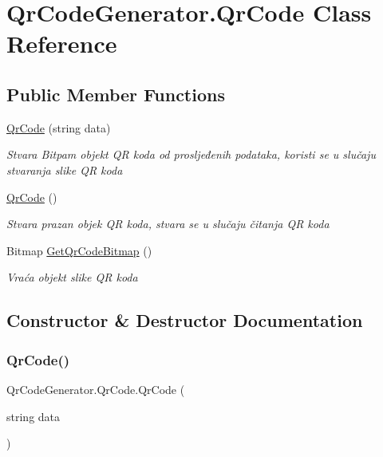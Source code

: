 \hypertarget{class_qr_code_generator_1_1_qr_code}{}\section{Qr\+Code\+Generator.\+Qr\+Code Class Reference}
\label{class_qr_code_generator_1_1_qr_code}
\subsection*{Public Member Functions}
\begin{DoxyCompactItemize}
\item 
\mbox{\hyperlink{class_qr_code_generator_1_1_qr_code_a99b0ad0b1072dd5499ce262a1cc0c8eb}{Qr\+Code}} (string data)
\begin{DoxyCompactList}\small\item\em Stvara Bitpam objekt QR koda od prosljeđenih podataka, koristi se u slučaju stvaranja slike QR koda \end{DoxyCompactList}\item 
\mbox{\hyperlink{class_qr_code_generator_1_1_qr_code_a344ec2624de42c98084a987ac5747134}{Qr\+Code}} ()
\begin{DoxyCompactList}\small\item\em Stvara prazan objek QR koda, stvara se u slučaju čitanja QR koda \end{DoxyCompactList}\item 
Bitmap \mbox{\hyperlink{class_qr_code_generator_1_1_qr_code_afcb7ea41edae80596a5ba5d857fa3e32}{Get\+Qr\+Code\+Bitmap}} ()
\begin{DoxyCompactList}\small\item\em Vraća objekt slike QR koda \end{DoxyCompactList}\end{DoxyCompactItemize}


\subsection{Constructor \& Destructor Documentation}
\mbox{\label{class_qr_code_generator_1_1_qr_code_a99b0ad0b1072dd5499ce262a1cc0c8eb}} 
\subsubsection{\texorpdfstring{Qr\+Code()}{QrCode()}\hspace{0.1cm}{\footnotesize\ttfamily [1/2]}}
{\footnotesize\ttfamily Qr\+Code\+Generator.\+Qr\+Code.\+Qr\+Code (\begin{DoxyParamCaption}\item[{string}]{data }\end{DoxyParamCaption})}



